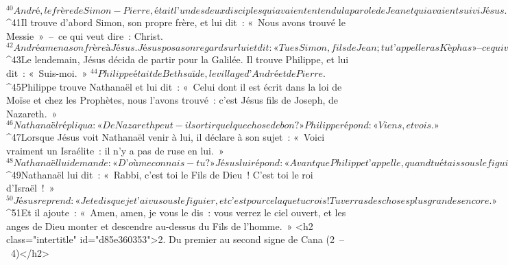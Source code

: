 ${}^{40}André, le frère de Simon-Pierre, était l’un des deux disciples qui avaient entendu la parole de Jean et qui avaient suivi Jésus. 
${}^{41}Il trouve d’abord Simon, son propre frère, et lui dit : « Nous avons trouvé le Messie » – ce qui veut dire : Christ. 
${}^{42}André amena son frère à Jésus. Jésus posa son regard sur lui et dit : « Tu es Simon, fils de Jean ; tu t’appelleras Kèphas » – ce qui veut dire : Pierre.
${}^{43}Le lendemain, Jésus décida de partir pour la Galilée. Il trouve Philippe, et lui dit : « Suis-moi. » 
${}^{44}Philippe était de Bethsaïde, le village d’André et de Pierre. 
${}^{45}Philippe trouve Nathanaël et lui dit : « Celui dont il est écrit dans la loi de Moïse et chez les Prophètes, nous l’avons trouvé : c’est Jésus fils de Joseph, de Nazareth. » 
${}^{46}Nathanaël répliqua : « De Nazareth peut-il sortir quelque chose de bon ? » Philippe répond : « Viens, et vois. » 
${}^{47}Lorsque Jésus voit Nathanaël venir à lui, il déclare à son sujet : « Voici vraiment un Israélite : il n’y a pas de ruse en lui. » 
${}^{48}Nathanaël lui demande : « D’où me connais-tu ? » Jésus lui répond : « Avant que Philippe t’appelle, quand tu étais sous le figuier, je t’ai vu. » 
${}^{49}Nathanaël lui dit : « Rabbi, c’est toi le Fils de Dieu ! C’est toi le roi d’Israël ! » 
${}^{50}Jésus reprend : « Je te dis que je t’ai vu sous le figuier, et c’est pour cela que tu crois ! Tu verras des choses plus grandes encore. » 
${}^{51}Et il ajoute : « Amen, amen, je vous le dis : vous verrez le ciel ouvert, et les anges de Dieu monter et descendre au-dessus du Fils de l’homme. »
      <h2 class="intertitle" id="d85e360353">2. Du premier au second signe de Cana (2 – 4)</h2>
      
